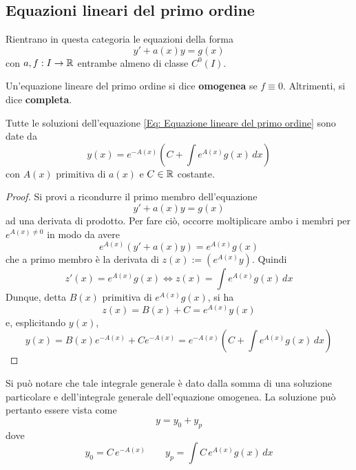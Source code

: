 \subsection{Equazioni lineari del primo ordine}
Rientrano in questa categoria le equazioni della forma
\begin{equation} \label{Eq: Equazione lineare del primo ordine}
    y'+ a(x) y = g(x)
\end{equation}
con $a,f: I \to \mathbb{R}$ entrambe almeno di classe $C^0(I)$.\\
\begin{definition}
    Un'equazione lineare del primo ordine si dice \textbf{omogenea} se $f \equiv 0$. Altrimenti, si dice \textbf{completa}.
\end{definition}
\begin{theorem} \label{Teo: Integrale generale delle ode lineare del primo ordine}
    Tutte le soluzioni dell'equazione \eqref{Eq: Equazione lineare del primo ordine} sono date da
    \begin{equation}
        y(x)=e^{-A(x)}\left(C+ \int{e^{A(x)}g(x)}\,dx\right)
    \end{equation}
    con $A(x)$ primitiva di $a(x)$ e $C \in \mathbb{R}$ costante.
\end{theorem}
\begin{proof} 
Si provi a ricondurre il primo membro  dell'equazione 
\begin{equation}
    y'+ a(x) y = g(x)
\end{equation}
ad una derivata di prodotto. Per fare ciò, occorre moltiplicare ambo i membri per $e^{A(x) \neq 0}$ in modo da avere
\begin{equation}
    e^{A(x)}(y'+a(x)y)= e^{A(x)}g(x)
\end{equation}
che a primo membro è la derivata di $z(x):=\left(e^{A(x)}y \right)$. Quindi
\begin{equation}
    z'(x)= e^{A(x)}g(x) \iff z(x)=\int e^{A(x)}g(x)\,dx
\end{equation}
Dunque, detta $B(x)$ primitiva di $e^{A(x)}g(x)$, si ha
\begin{equation}
 z(x)= B(x)+C= e^{A(x)}y(x)
 \end{equation}
 e, esplicitando $y(x)$,
 \begin{equation}
    y(x)= B(x) e^{-A(x)} + C{e^{-A(x)}} = e^{-A(x)}\left( C + \int e^{A(x)}g(x)\,dx \right)
 \end{equation}
\end{proof}
\begin{oss}    
Si può notare che tale integrale generale è dato dalla somma di una soluzione particolare e dell'integrale generale dell'equazione omogenea. La soluzione può pertanto essere vista come
\begin{equation}
    y=y_0+ y_p
\end{equation}
dove
\begin{equation}
    y_0= C\, e^{-A(x)} \qquad y_p= \int C\, e^{A(x)}g(x)\,dx
\end{equation}
\end{oss}

